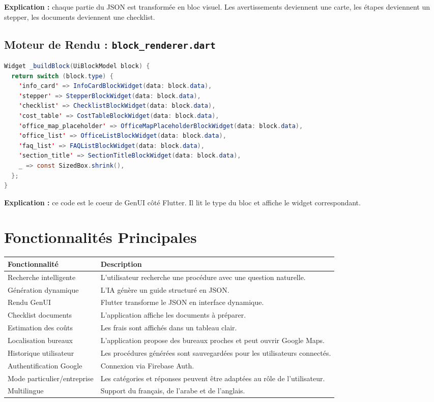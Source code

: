 \documentclass[12pt,a4paper]{report}
\begin{document}
\textbf{Explication :} chaque partie du JSON est transformée en bloc visuel. Les avertissements deviennent une carte, les étapes deviennent un stepper, les documents deviennent une checklist.

\section{Moteur de Rendu : \texttt{block\_renderer.dart}}

\begin{lstlisting}[language=Java,caption={Rendu dynamique des blocs GenUI}]
Widget _buildBlock(UiBlockModel block) {
  return switch (block.type) {
    'info_card' => InfoCardBlockWidget(data: block.data),
    'stepper' => StepperBlockWidget(data: block.data),
    'checklist' => ChecklistBlockWidget(data: block.data),
    'cost_table' => CostTableBlockWidget(data: block.data),
    'office_map_placeholder' => OfficeMapPlaceholderBlockWidget(data: block.data),
    'office_list' => OfficeListBlockWidget(data: block.data),
    'faq_list' => FAQListBlockWidget(data: block.data),
    'section_title' => SectionTitleBlockWidget(data: block.data),
    _ => const SizedBox.shrink(),
  };
}
\end{lstlisting}

\textbf{Explication :} ce code est le coeur de GenUI côté Flutter. Il lit le type du bloc et affiche le widget correspondant.


\chapter{Fonctionnalités Principales}

\begin{longtable}{|p{4cm}|p{10cm}|}
\hline
\textbf{Fonctionnalité} & \textbf{Description} \\
\hline
\endhead
Recherche intelligente & L'utilisateur recherche une procédure avec une question naturelle. \\
\hline
Génération dynamique & L'IA génère un guide structuré en JSON. \\
\hline
Rendu GenUI & Flutter transforme le JSON en interface dynamique. \\
\hline
Checklist documents & L'application affiche les documents à préparer. \\
\hline
Estimation des coûts & Les frais sont affichés dans un tableau clair. \\
\hline
Localisation bureaux & L'application propose des bureaux proches et peut ouvrir Google Maps. \\
\hline
Historique utilisateur & Les procédures générées sont sauvegardées pour les utilisateurs connectés. \\
\hline
Authentification Google & Connexion via Firebase Auth. \\
\hline
Mode particulier/entreprise & Les catégories et réponses peuvent être adaptées au rôle de l'utilisateur. \\
\hline
Multilingue & Support du français, de l'arabe et de l'anglais. \\
\hline
\end{longtable}
\end{document}
